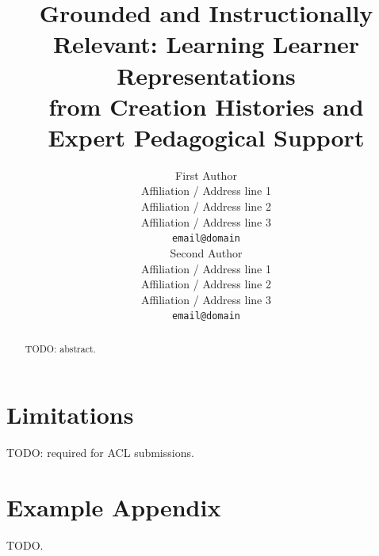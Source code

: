 \documentclass[11pt]{article}
\title{Grounded and Instructionally Relevant: Learning Learner Representations \\ from Creation Histories and Expert Pedagogical Support}
\author{First Author \\
  Affiliation / Address line 1 \\
  Affiliation / Address line 2 \\
  Affiliation / Address line 3 \\
  \texttt{email@domain} \\\And
  Second Author \\
  Affiliation / Address line 1 \\
  Affiliation / Address line 2 \\
  Affiliation / Address line 3 \\
  \texttt{email@domain} \\}
\begin{document}
\maketitle
\begin{abstract}
TODO: abstract.
\end{abstract}








\section*{Limitations}
TODO: required for ACL submissions.


%


\appendix

\section{Example Appendix}
\label{sec:appendix}
TODO.
\end{document}
